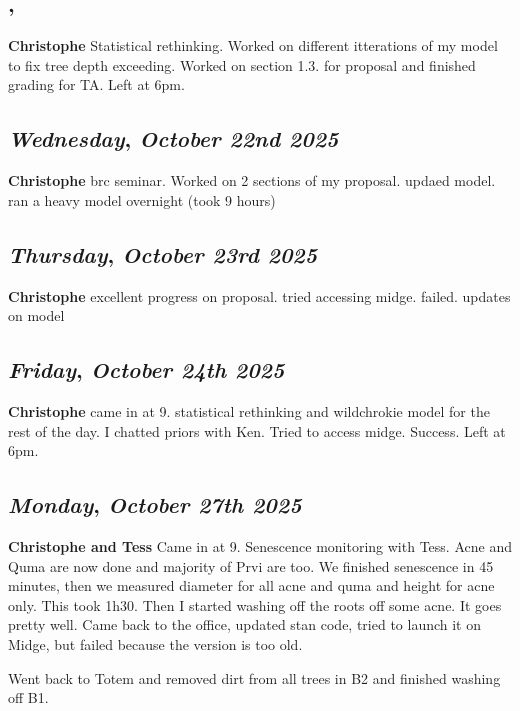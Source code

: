 \subsection*{\weekday, \day}
\textbf {Christophe}
Statistical rethinking. Worked on different itterations of my model to fix tree depth exceeding. Worked on section 1.3. for proposal and finished grading for TA. Left at 6pm.

\def\day{\textit{October 22nd 2025}}
\def\weekday{\textit{Wednesday}}
\subsection*{\weekday, \day}
\textbf {Christophe}
brc seminar. Worked on 2 sections of my proposal. updaed model. ran a heavy model overnight (took 9 hours)

\def\day{\textit{October 23rd 2025}}
\def\weekday{\textit{Thursday}}
\subsection*{\weekday, \day}
\textbf {Christophe}
excellent progress on proposal. tried accessing midge. failed. updates on model

\def\day{\textit{October 24th 2025}}
\def\weekday{\textit{Friday}}
\subsection*{\weekday, \day}
\textbf {Christophe}
came in at 9. statistical rethinking and wildchrokie model for the rest of the day. I chatted priors with Ken. Tried to access midge. Success. Left at 6pm. 

\def\day{\textit{October 27th 2025}}
\def\weekday{\textit{Monday}}
\subsection*{\weekday, \day}
\textbf {Christophe and Tess}
Came in at 9. Senescence monitoring with Tess. Acne and Quma are now done and majority of Prvi are too. We finished senescence in 45 minutes, then we measured diameter for all acne and quma and height for acne only. This took 1h30. Then I started washing off the roots off some acne. It goes pretty well. Came back to the office, updated stan code, tried to launch it on Midge, but failed because the version is too old.

Went back to Totem and removed dirt from all trees in B2 and finished washing off B1.

